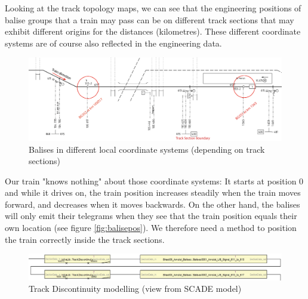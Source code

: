 \documentclass{template/openetcs_article}
\begin{document}
Looking at the track topology maps, we can see that the engineering positions of balise groups that a train may pass can be on different track sections that may exhibit different origins for the distances (kilometres). These different coordinate systems are of course also reflected in the engineering data.

\begin{figure}[H]
  \centering
  \includegraphics[width=6in]{images/CoordJump.eps}
   \caption{Balises in different local coordinate systems (depending on track sections)}
  \label{fig:balisecoord}
\end{figure}

Our train "knows nothing" about those coordinate systems: It starts at position 0 and while it drives on, the train position increases steadily when the train moves forward, and decreases when it moves backwards.\newline
On the other hand, the balises will only emit their telegrams when they see that the train position equals their own location (see figure \ref{fig:balisepos}).\newline
We therefore need a method to position the train correctly inside the track sections.

\begin{figure}[H]
  \centering
  \includegraphics[width=6.5in]{images/TrackDiscont.eps}
   \caption{Track Discontinuity modelling (view from SCADE model)}
  \label{fig:trackjump}
\end{figure}
\end{document}
